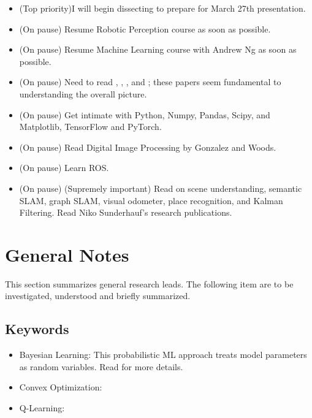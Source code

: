 \documentclass[11pt]{article}
\begin{document}
\begin{itemize}

	\item (Top priority)I will begin dissecting \cite{discoman} to prepare for March 27th presentation.

	\item (On pause) Resume Robotic Perception course as soon as possible.

	\item (On pause) Resume Machine Learning course with Andrew Ng as soon as possible.

	\item (On pause) Need to read \cite{ImSRwDeepCNN}, \cite{MixDNNforSISR}, \cite{mModalSemanticSLAMwProb}, and \cite{RCANforImClass}; these papers seem fundamental to understanding the overall picture.

	\item (On pause) Get intimate with Python, Numpy, Pandas, Scipy, and Matplotlib, TensorFlow and PyTorch.

	\item (On pause) Read Digital Image Processing by Gonzalez and Woods.

	\item (On pause) Learn ROS.

	\item (On pause) (Supremely important) Read on scene understanding, semantic SLAM, graph SLAM, visual odometer, place recognition, and Kalman Filtering. Read Niko Sunderhauf's research publications.

\end{itemize}


\section{General Notes}
This section summarizes general research leads. The following item are to be investigated, understood and briefly summarized.

\subsection{Keywords}
\begin{itemize}
	\item Bayesian Learning: This probabilistic ML approach treats model parameters as random variables. Read \cite{Bayesian_Learning_2012} for more details.

	\item Convex Optimization:

	\item Q-Learning:
\end{itemize}
\end{document}
